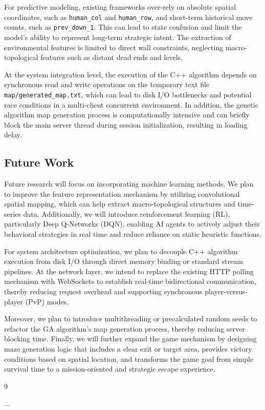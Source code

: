 \documentclass[12pt,a4paper]{article}
\begin{document}
For predictive modeling, existing frameworks over-rely on absolute spatial coordinates, such as \texttt{human\_col} and \texttt{human\_row}, and short-term historical move counts, such as \texttt{prev\_down\_1}. This can lead to state confusion and limit the model's ability to represent long-term strategic intent. The extraction of environmental features is limited to direct wall constraints, neglecting macro-topological features such as distant dead ends and levels.

At the system integration level, the execution of the C++ algorithm depends on synchronous read and write operations on the temporary text file \texttt{map/generated\_map.txt}, which can lead to disk I/O bottlenecks and potential race conditions in a multi-client concurrent environment. In addition, the genetic algorithm map generation process is computationally intensive and can briefly block the main server thread during session initialization, resulting in loading delay.

\subsection{Future Work}

Future research will focus on incorporating machine learning methods. We plan to improve the feature representation mechanism by utilizing convolutional spatial mapping, which can help extract macro-topological structures and time-series data. Additionally, we will introduce reinforcement learning (RL), particularly Deep Q-Networks (DQN), enabling AI agents to actively adjust their behavioral strategies in real time and reduce reliance on static heuristic functions.

For system architecture optimization, we plan to decouple C++ algorithm execution from disk I/O through direct memory binding or standard stream pipelines. At the network layer, we intend to replace the existing HTTP polling mechanism with WebSockets to establish real-time bidirectional communication, thereby reducing request overhead and supporting synchronous player-versus-player (PvP) modes.

Moreover, we plan to introduce multithreading or precalculated random seeds to refactor the GA algorithm's map generation process, thereby reducing server blocking time. Finally, we will further expand the game mechanism by designing maze generation logic that includes a clear exit or target area, provides victory conditions based on spatial location, and transforms the game goal from simple survival time to a mission-oriented and strategic escape experience.

\begin{thebibliography}{9}

...

\end{thebibliography}
\end{document}
